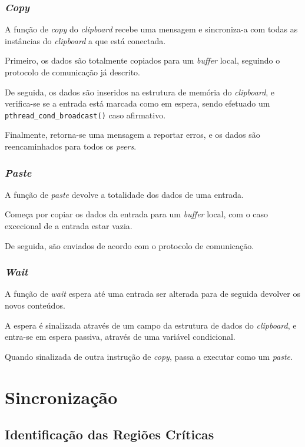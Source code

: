 \documentclass{article}
\begin{document}
\subsubsection{\textit{Copy}}

A função de \textit{copy} do \textit{clipboard} recebe uma mensagem e
sincroniza-a com todas as instâncias do \textit{clipboard} a que está
conectada.

Primeiro, os dados são totalmente copiados para um \textit{buffer} local, seguindo o protocolo de comunicação já descrito.

De seguida, os dados são inseridos na estrutura de memória do \textit{clipboard}, e verifica-se se a entrada está marcada como em espera, sendo efetuado um \texttt{pthread_cond_broadcast()} caso afirmativo.

Finalmente, retorna-se uma mensagem a reportar erros, e os dados são reencaminhados para todos os \textit{peers}.

\subsubsection{\textit{Paste}}

A função de \textit{paste} devolve a totalidade dos dados de uma entrada.

Começa por copiar os dados da entrada para um \textit{buffer} local, com o caso excecional de a entrada estar vazia.

De seguida, são enviados de acordo com o protocolo de comunicação.

\subsubsection{\textit{Wait}}

A função de \textit{wait} espera até uma entrada ser alterada para de seguida devolver os novos conteúdos.

A espera é sinalizada através de um campo da estrutura de dados do \textit{clipboard}, e entra-se em espera passiva, através de uma variável condicional.

Quando sinalizada de outra instrução de \textit{copy}, passa a executar como um \textit{paste}.


\section{Sincronização}
\subsection{Identificação das Regiões Críticas}
\end{document}
